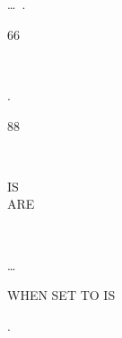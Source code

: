 \begin{syntax}
\begin{0-1}
     \identifier \\

     \\

    \begin{1=}
       \\
       \\
    \end{1=}
    \begin{0-1}
       \\
    \end{0-1} \\

     \\

  \end{0-1}\ldots\ {}.
\end{syntax}

\begin{syntax}
  66 \identifier {} \identifier
  \begin{0-1}
    \begin{1=}
       \\
    \end{1=}
    \identifier
  \end{0-1}.
\end{syntax}

\begin{syntax}
  88 \identifier
  \begin{1=}
     \\
  \end{1=}
  \begin{0-1}
    IS \\
    ARE
  \end{0-1}
  \begin{1=}
    \literal
    \begin{0-1}
      \begin{1=}
         \\
      \end{1=}
      \literal
    \end{0-1}
  \end{1=} \ldots

  \begin{0-1}
    WHEN SET TO  IS \literal
  \end{0-1}.
\end{syntax}

